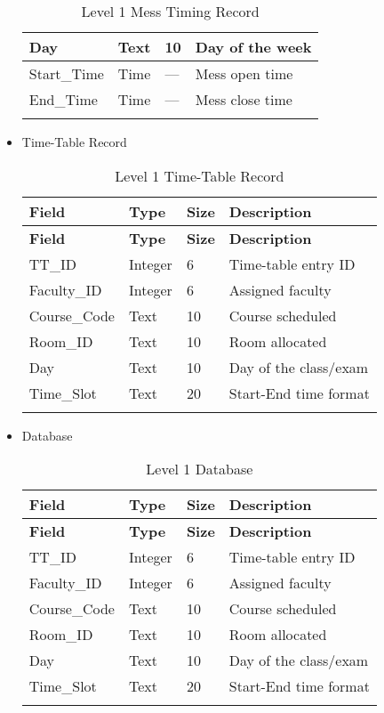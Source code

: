 \documentclass[a4paper,12pt]{article}
\begin{document}
\begin{itemize}
\begin{longtable}{|p{3cm}|p{2cm}|p{1.5cm}|p{6cm}|}
\hline
\endfoot

\hline
\endlastfoot

Day & Text & 10 & Day of the week \\
\hline
Start\_Time & Time & — & Mess open time \\
\hline
End\_Time & Time & — & Mess close time \\
\hline
\caption{Level 1 Mess Timing Record}
\label{tag:placeholder}
\end{longtable}


\item {Time-Table Record}
\begin{longtable}{|p{3cm}|p{2cm}|p{1.5cm}|p{6cm}|}
\hline
\textbf{Field} & \textbf{Type} & \textbf{Size} & \textbf{Description} \\
\hline
\endfirsthead

\hline
\textbf{Field} & \textbf{Type} & \textbf{Size} & \textbf{Description} \\
\hline
\endhead

\hline
\endfoot

\hline
\endlastfoot

TT\_ID & Integer & 6 & Time-table entry ID \\
\hline
Faculty\_ID & Integer & 6 & Assigned faculty \\
\hline
Course\_Code & Text & 10 & Course scheduled \\
\hline
Room\_ID & Text & 10 & Room allocated \\
\hline
Day & Text & 10 & Day of the class/exam \\
\hline
Time\_Slot & Text & 20 & Start-End time format \\
\hline
\caption{Level 1 Time-Table Record}
\label{tag:placeholder}
\end{longtable}

\newpage
\item{Database}
\begin{longtable}{|p{3cm}|p{2cm}|p{1.5cm}|p{6cm}|}
\hline
\textbf{Field} & \textbf{Type} & \textbf{Size} & \textbf{Description} \\
\hline
\endfirsthead

\hline
\textbf{Field} & \textbf{Type} & \textbf{Size} & \textbf{Description} \\
\hline
\endhead

\hline
\endfoot

\hline
\endlastfoot

TT\_ID & Integer & 6 & Time-table entry ID \\
\hline
Faculty\_ID & Integer & 6 & Assigned faculty \\
\hline
Course\_Code & Text & 10 & Course scheduled \\
\hline
Room\_ID & Text & 10 & Room allocated \\
\hline
Day & Text & 10 & Day of the class/exam \\
\hline
Time\_Slot & Text & 20 & Start-End time format \\
\hline
\caption{Level 1 Database}
\label{tag:placeholder}
\end{longtable}

\end{itemize}
\newpage
\end{document}
